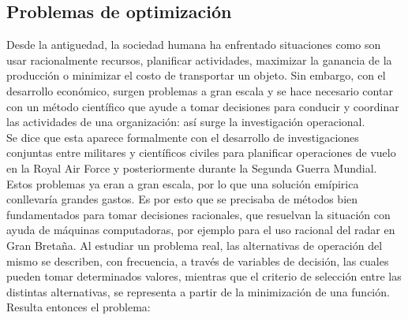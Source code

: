 \documentclass[10pt,twoside]{SelfArx} %
\begin{document}
    
    
    
    
    
    
    
 
 \subsection{Problemas de optimizaci\'on}
  Desde la antiguedad, la sociedad humana ha enfrentado situaciones como son
  usar racionalmente recursos, planificar actividades, maximizar la ganancia de la
  producción o minimizar el costo de transportar un objeto. Sin embargo, con el
  desarrollo económico, surgen problemas a gran escala y se hace necesario contar
  con un método científico que ayude a tomar decisiones para conducir y coordinar las actividades de una organizaci\'on: as\'i surge la investigaci\'on operacional.\\
  Se dice que esta aparece formalmente con el desarrollo de investigaciones conjuntas entre militares y cient\'ificos civiles para planificar operaciones de vuelo en  la Royal Air Force y posteriormente durante la Segunda Guerra Mundial. 
  Estos  problemas ya eran a gran escala, por lo que una soluci\'on em\'ipirica conllevar\'ia  grandes gastos.
   Es por esto que se precisaba de m\'etodos bien fundamentados para tomar decisiones racionales, que resuelvan la situaci\'on con ayuda de m\'aquinas
  computadoras, por ejemplo para el uso racional del radar en Gran Bretaña.
  Al estudiar un problema real, las alternativas de operación del mismo se describen, con frecuencia, a través de variables de decisión, las cuales pueden tomar
  determinados valores, mientras que el criterio de selecci\'on entre las distintas
  alternativas, se representa a partir de la minimizaci\'on de una funci\'on. Resulta
  entonces el problema:
  
\end{document}
